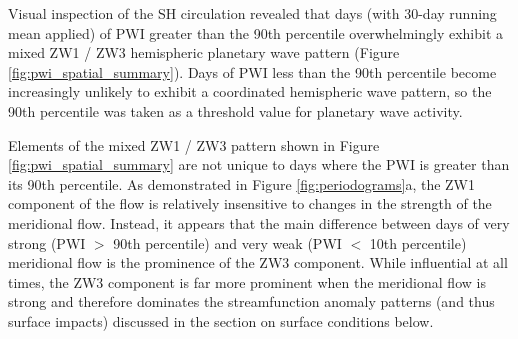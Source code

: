 Visual inspection of the SH circulation revealed that days (with 30-day running mean applied) of PWI greater than the 90th percentile overwhelmingly exhibit a mixed ZW1 / ZW3 hemispheric planetary wave pattern (Figure \ref{fig:pwi_spatial_summary}). Days of PWI less than the 90th percentile become increasingly unlikely to exhibit a coordinated hemispheric wave pattern, so the 90th percentile was taken as a threshold value for planetary wave activity. 

Elements of the mixed ZW1 / ZW3 pattern shown in Figure \ref{fig:pwi_spatial_summary} are not unique to days where the PWI is greater than its 90th percentile. As demonstrated in Figure \ref{fig:periodograms}a, the ZW1 component of the flow is relatively insensitive to changes in the strength of the meridional flow. Instead, it appears that the main difference between days of very strong (PWI $>$ 90th percentile) and very weak (PWI $<$ 10th percentile) meridional flow is the prominence of the ZW3 component. While influential at all times, the ZW3 component is far more prominent when the meridional flow is strong and therefore dominates the streamfunction anomaly patterns (and thus surface impacts) discussed in the section on surface conditions below. 

